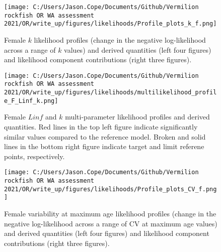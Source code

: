 \documentclass[11pt,
  english,
  a4paper,
]{article}
\begin{document}
\begin{figure}
\centering
\texttt{[image: C:/Users/Jason.Cope/Documents/Github/Vermilion rockfish OR WA assessment 2021/OR/write\_up/figures/likelihoods/Profile\_plots\_k\_f.png]}
\caption{Female {\(k\)\leavevmode\tagmcend\tagstructend} likelihood profiles (change in the negative log-likelihood across a range of {\(k\)\leavevmode\tagmcend\tagstructend} values) and derived quantities (left four figures) and likelihood component contributions (right three figures).\label{fig:k_f-profile-combo}}
\end{figure}

\tagmcend\tagstructend


\begin{figure}
\centering
\texttt{[image: C:/Users/Jason.Cope/Documents/Github/Vermilion rockfish OR WA assessment 2021/OR/write\_up/figures/likelihoods/multilikelihood\_profile\_F\_Linf\_k.png]}
\caption{Female {\(Linf\)\leavevmode\tagmcend\tagstructend} and {\(k\)\leavevmode\tagmcend\tagstructend} multi-parameter likelihood profiles and derived quantities. Red lines in the top left figure indicate significantly similar values compared to the reference model. Broken and solid lines in the bottom right figure indicate target and limit referene points, respectively.\label{fig:Linf_k_f-profile}}
\end{figure}

\tagmcend\tagstructend


\begin{figure}
\centering
\texttt{[image: C:/Users/Jason.Cope/Documents/Github/Vermilion rockfish OR WA assessment 2021/OR/write\_up/figures/likelihoods/Profile\_plots\_CV\_f.png]}
\caption{Female variability at maximum age likelihood profiles (change in the negative log-likelihood across a range of CV at maximum age values) and derived quantities (left four figures) and likelihood component contributions (right three figures).\label{fig:CVold_f-profile-combo}}
\end{figure}
\end{document}
